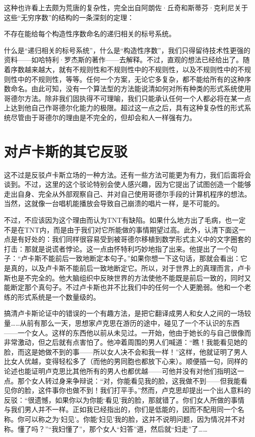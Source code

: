 这种也许看上去颇为荒唐的复杂性，完全出自阿朗佐·丘奇和斯蒂芬·克利尼关于这些“无穷序数”的结构的一条深刻的定理：

\begin{block}
不存在能给每个构造性序数命名的递归相关的标号系统。
\end{block}
什么是“递归相关的标号系统”，什么是“构造性序数”，我们只得留待技术性更强的资料——如哈特利·罗杰斯的著作——去解释。不过，直观的想法已经给出了。随着序数越来越大，就有不规则性和不规则性中的不规则性，以及不规则性中的不规则性中的不规则性，等等。任何一个方案，无论它多复杂，都不能给所有的这种序数命名。由此可知，没有一个算法型的方法能说清如何对所有种类的形式系统使用哥德尔方法。除非我们固执得不可理喻，我们只能承认任何一个人都必将在某一点上达到他自己作哥德尔化能力的极限。超过这一点之后，具有这种复杂性的形式系统尽管由于哥德尔的理由是不完全的，但却会和人一样强有力。

\section{对卢卡斯的其它反驳}

这不过是反驳卢卡斯立场的一种方法。还有一些方法可能更为有力，我们后面将会谈到。不过，这里的这个驳论特别会使人感兴趣，因为它提出了试图创造一个能够走出自身、完全从外部观察自己、并对自己使用哥德尔手段的计算机程序的想法。当然，这就像一台唱机能播放会导致自己崩溃的唱片一样，是不可能的。

不过，不应该因为这个理由而认为TNT有缺陷。如果什么地方出了毛病，也一定不是在TNT内，而是由于我们对它所能做的事情期望过高。此外，认清下面这一点是有好处的：我们同样很容易受到被哥德尔移植到数学形式主义中的文字圈套的打击：那就是说谎者悖论。这一点由怀特利巧妙地指了出来。他提出了一个句子：“卢卡斯不能前后一致地断定本句子。”如果你想一下这句话，那就会看出：它是真的，以及卢卡斯不能前后一致地断定它。所以，对于世界上的真理而言，卢卡斯也是不完全的。他大脑组织中反映世界的方法使他不能既是前后一致的，同时又能断定那个真句子。不过卢卡斯也并不比我们中的任何一个人更脆弱。他和一个老练的形式系统是一个数量级的。

搞清卢卡斯论证中的错误的一个有趣方法，是把它翻译成男人和女人之间的一场较量……从前有那么一天，思想家卢克思在游历的途中，碰见了一个不认识的东西——一个女人。这样的东西他以前从未见过。一开始，他由于她长的与自己很像而非常激动，但之后就有点害怕了。他冲着周围的男人们喊道：“瞧！我能看见她的脸，而这是她做不到的事——所以女人决不会和我一样！”这样，他就证明了男人比女人优越，变得轻松多了（而他的男同胞也都放下心来）。顺便插一句，同样的论述也能证明卢克思比其他所有的男人也都优越——可他并没有对他们指明这一点。那个女人转过身来争辩说：“对，你能看见我的脸，这我做不到——但我能看见你的脸，这件事你也做不到！我们打平手。”然而，卢克思却提出一个出人意料的反驳：“很遗憾，如果你以为你能‘看见’我的脸，那就错了。你们女人所做的事情与我们男人并不一样。正如我已经指出的，你们是低能的，因而不配用同一个名称。你可以称之为‘妇见’。你能‘妇见’我的脸，这并不说明问题，因为情况并不对称。懂了吗？”“我妇懂了”，那个女人“妇答”道，然后就“妇走”了……

